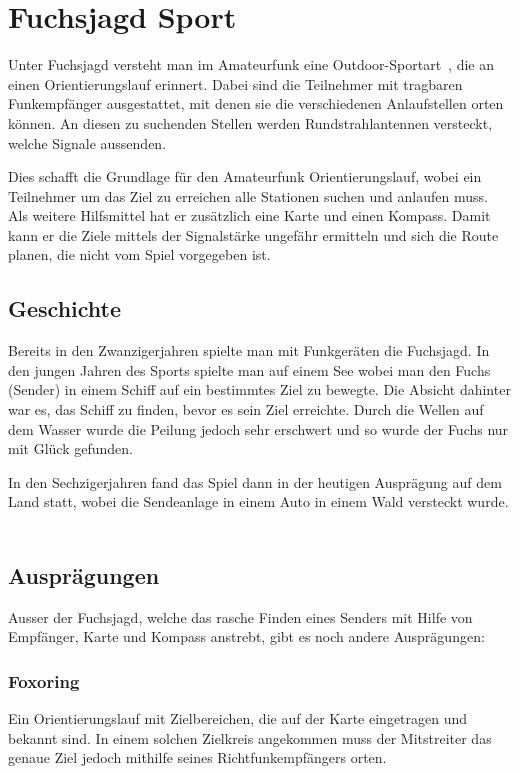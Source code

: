 
\newpage
\section{Fuchsjagd Sport} %
\label{sec:Fuchsjagd Sport}

Unter Fuchsjagd versteht man im Amateurfunk eine Outdoor-Sportart~\cite{bib:amateurfunk_wiki}, die an einen Orientierungslauf erinnert. Dabei sind die Teilnehmer mit tragbaren Funkempfänger ausgestattet, mit denen sie die verschiedenen Anlaufstellen orten können. An diesen zu suchenden Stellen werden Rundstrahlantennen versteckt, welche Signale aussenden.

Dies schafft die Grundlage für den Amateurfunk Orientierungslauf, wobei ein Teilnehmer um das Ziel zu erreichen alle Stationen suchen und anlaufen muss. Als weitere Hilfsmittel hat er zusätzlich eine Karte und einen Kompass. Damit kann er die Ziele mittels der Signalstärke ungefähr ermitteln und sich die Route planen, die nicht vom Spiel vorgegeben ist. 

\subsection{Geschichte} %
\label{sub:Geschichte}

Bereits in den Zwanzigerjahren spielte man mit Funkgeräten die Fuchsjagd. In den jungen Jahren des Sports spielte man auf einem See wobei man den Fuchs (Sender) in einem Schiff auf ein bestimmtes Ziel zu bewegte. Die Absicht dahinter war es, das Schiff zu finden, bevor es sein Ziel erreichte. Durch die Wellen auf dem Wasser wurde die Peilung jedoch sehr erschwert und so wurde der Fuchs nur mit Glück gefunden.

In den Sechzigerjahren fand das Spiel dann in der heutigen Ausprägung auf dem Land statt, wobei die Sendeanlage in einem Auto in einem Wald versteckt wurde. ~\cite{bib:ardf}

\subsection{Ausprägungen} %
\label{sub:Ausprägungen}

Ausser der Fuchsjagd, welche das rasche Finden eines Senders mit Hilfe von Empfänger, Karte und Kompass anstrebt, gibt es noch andere Ausprägungen:

\subsubsection{Foxoring} %
\label{ssub:Foxoring}
Ein Orientierungslauf mit Zielbereichen, die auf der Karte eingetragen und bekannt sind. In einem solchen Zielkreis angekommen muss der Mitstreiter das genaue Ziel jedoch mithilfe seines Richtfunkempfängers orten.

